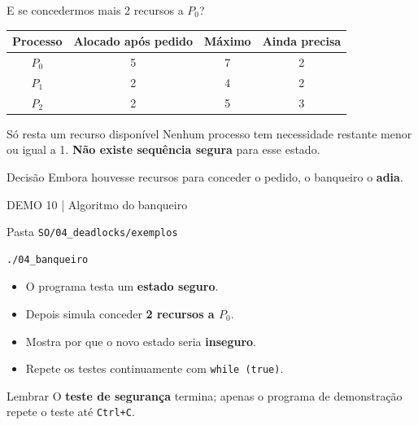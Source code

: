 \documentclass[aspectratio=169,11pt]{beamer}
\begin{document}
\begin{frame}{E se concedermos mais 2 recursos a $P_0$?}
\small
\begin{center}
\begin{tabular}{cccc}
\toprule
\textbf{Processo} & \textbf{Alocado após pedido} & \textbf{Máximo} & \textbf{Ainda precisa}\\
\midrule
$P_0$ & 5 & 7 & 2\\
$P_1$ & 2 & 4 & 2\\
$P_2$ & 2 & 5 & 3\\
\bottomrule
\end{tabular}
\end{center}
\vspace{.2cm}
\begin{alertblock}{Só resta um recurso disponível}
Nenhum processo tem necessidade restante menor ou igual a 1. \textbf{Não existe sequência segura} para esse estado.
\end{alertblock}
\begin{block}{Decisão}
Embora houvesse recursos para conceder o pedido, o banqueiro o \textbf{adia}.
\end{block}
\end{frame}

\begin{frame}[fragile]{DEMO 10 | Algoritmo do banqueiro}
\small
\begin{block}{Pasta \texttt{SO/04\_deadlocks/exemplos}}
\begin{verbatim}
./04_banqueiro
\end{verbatim}
\end{block}
\begin{itemize}
\item O programa testa um \textbf{estado seguro}.
\item Depois simula conceder \textbf{2 recursos a $P_0$}.
\item Mostra por que o novo estado seria \textbf{inseguro}.
\item Repete os testes continuamente com \texttt{while (true)}.
\end{itemize}
\begin{alertblock}{Lembrar}
O \textbf{teste de segurança} termina; apenas o programa de demonstração repete o teste até \texttt{Ctrl+C}.
\end{alertblock}
\end{frame}
\end{document}
